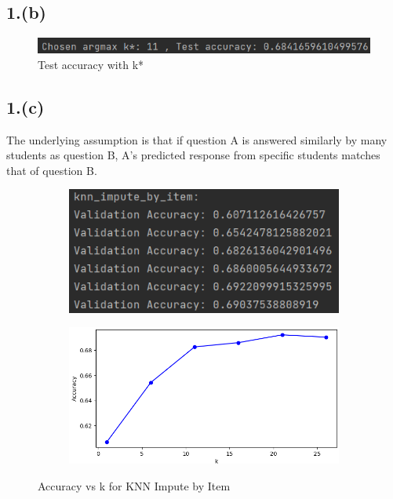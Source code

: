 \documentclass{article}
\begin{document}
\subsection*{1.(b)}

\begin{figure}[H]
    \centering
    \includegraphics[width=\textwidth]{knn_impute_by_user_test.png}
    \caption{Test accuracy with k*}
\end{figure}

\subsection*{1.(c)}

The underlying assumption is that if question A is answered similarly by many students as question B, A’s predicted response from specific students matches that of question B.

\begin{figure}[H]
    \centering
    \begin{subfigure}{0.45\textwidth}
        \includegraphics[width=\textwidth]{knn_impute_by_item_result.png}
    \end{subfigure}
    \hfill
    \begin{subfigure}{0.45\textwidth}
        \includegraphics[width=\textwidth]{knn_impute_by_item_plot.png}
    \end{subfigure}
    \caption{Accuracy vs k for KNN Impute by Item}
\end{figure}
\end{document}
